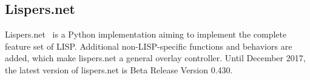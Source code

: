 



\subsection{Lispers.net}
\label{subsec:implementation_lispers}
Lispers.net~\cite{lispers} is a Python implementation aiming to implement the complete feature set of LISP. Additional non-LISP-specific functions and behaviors are added, which make lispers.net a general overlay controller. Until December  2017, the latest version of lispers.net is Beta Release Version 0.430.







